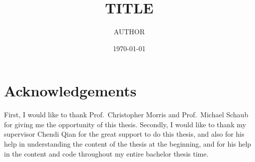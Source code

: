 \documentclass[
    numbers=noenddot,
    parskip=half-,
    fontsize=12pt,
    paper=a4,
    oneside,
    titlepage,
    bibliography=totoc,
    chapterprefix=false,
    headheight=30pt,
    footheight=30pt
]{scrbook}
\title{TITLE}
\author{AUTHOR}
\date{\today}
\begin{document}
\frontmatter

% 

\tableofcontents
\newpage

% 
\cleardoublepage
{}
{}
\chapter*{Acknowledgements}
First, I would like to thank Prof.~Christopher Morris and Prof.~Michael Schaub for giving me the opportunity of this thesis. 
Secondly, I would like to thank my supervisor Chendi Qian for the great support to do this thesis, and also for his help in understanding the content of the thesis at the beginning, and for his help in the content and code throughout my entire bachelor thesis time.


\thispagestyle{empty}
\cleardoublepage
{}
{}
\listoffigures
\newpage

\thispagestyle{empty}
\cleardoublepage
{}
{}
\listoftables
\newpage


\cleardoublepage
{}

% 




\mainmatter







\begin{appendices}
    
\end{appendices}
\newpage


\backmatter

\printbibliography

% 
\end{document}
